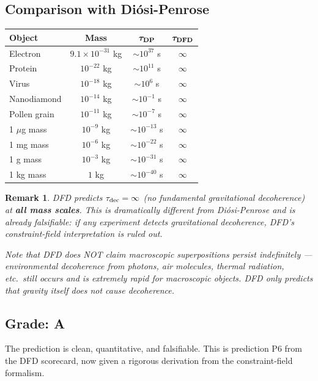 \documentclass[11pt,a4paper]{article}
\newtheorem{remark}{Remark}
\begin{document}
\subsection{Comparison with Di\'{o}si-Penrose}

\begin{center}
\begin{tabular}{lccc}
\toprule
\textbf{Object} & \textbf{Mass} & $\boldsymbol{\tau_{\rm DP}}$ & $\boldsymbol{\tau_{\rm DFD}}$ \\
\midrule
Electron & $9.1\times 10^{-31}$ kg & $\sim 10^{37}$ s & $\infty$ \\
Protein & $10^{-22}$ kg & $\sim 10^{11}$ s & $\infty$ \\
Virus & $10^{-18}$ kg & $\sim 10^{6}$ s & $\infty$ \\
Nanodiamond & $10^{-14}$ kg & $\sim 10^{-1}$ s & $\infty$ \\
Pollen grain & $10^{-11}$ kg & $\sim 10^{-7}$ s & $\infty$ \\
1 $\mu$g mass & $10^{-9}$ kg & $\sim 10^{-13}$ s & $\infty$ \\
1 mg mass & $10^{-6}$ kg & $\sim 10^{-22}$ s & $\infty$ \\
1 g mass & $10^{-3}$ kg & $\sim 10^{-31}$ s & $\infty$ \\
1 kg mass & $1$ kg & $\sim 10^{-40}$ s & $\infty$ \\
\bottomrule
\end{tabular}
\end{center}

\begin{remark}
DFD predicts $\tau_{\rm dec} = \infty$ (no fundamental gravitational decoherence) at \textbf{all mass scales}. This is dramatically different from Di\'{o}si-Penrose and is already falsifiable: if any experiment detects gravitational decoherence, DFD's constraint-field interpretation is ruled out.

Note that DFD does NOT claim macroscopic superpositions persist indefinitely --- environmental decoherence from photons, air molecules, thermal radiation, etc.\ still occurs and is extremely rapid for macroscopic objects. DFD only predicts that \emph{gravity itself} does not cause decoherence.
\end{remark}

\subsection{Grade: A}

The prediction is clean, quantitative, and falsifiable. This is prediction P6 from the DFD scorecard, now given a rigorous derivation from the constraint-field formalism.
\end{document}
